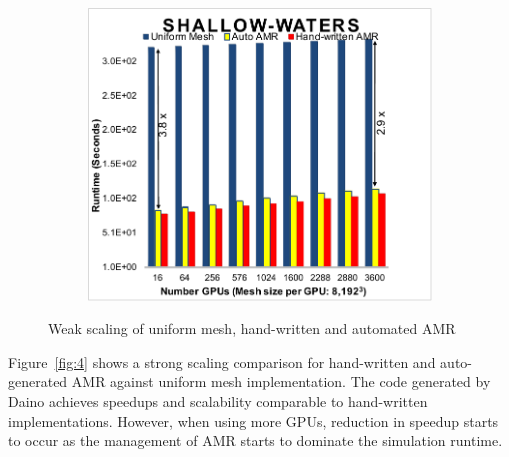 \documentclass{book}
\begin{document}
\begin{figure}
\begin{subfigure}[t]{0.32\textwidth}
\end{subfigure}
\begin{subfigure}[t]{0.32\textwidth}
\centering
\includegraphics[width=\textwidth]{figs/amr05.pdf} 
 \end{subfigure}
\caption{Weak scaling of uniform mesh, hand-written and automated AMR}
\label{fig:3}
\end{figure}
Figure~\ref{fig:4} shows a strong scaling comparison for hand-written and auto-generated AMR against uniform mesh implementation. The code generated by Daino achieves speedups and scalability comparable to hand-written implementations. However, when using more GPUs, reduction in speedup starts to occur as the management of AMR starts to dominate the simulation runtime.
\end{document}
